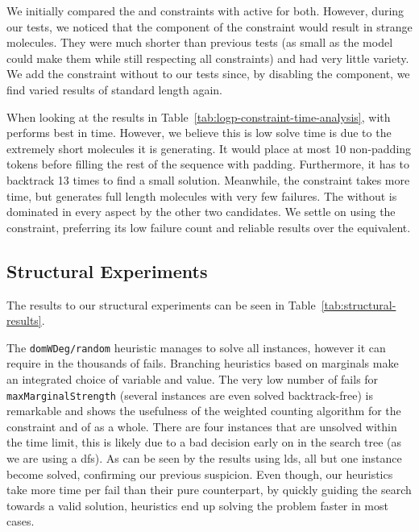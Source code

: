 \documentclass[../Document.tex]{subfiles}
\begin{document}
We initially compared the \shortTable and \regular constraints with \bp active for both. However, during our tests, we noticed that the \bp component of the \shortTable constraint would result in strange molecules. They were much shorter than previous tests (as small as the model could make them while still respecting all constraints) and had very little variety. We add the \shortTable constraint without \bp to our tests since, by disabling the \bp component, we find varied results of standard length again.

When looking at the results in Table~\ref{tab:logp-constraint-time-analysis}, \shortTable with \bp performs best in time.
However, we believe this is low solve time is due to the extremely short molecules it is generating. It would place at most 10 non-padding tokens before filling the rest of the sequence with padding.
Furthermore, it has to backtrack 13 times to find a small solution.
Meanwhile, the \regular constraint takes more time, but generates full length molecules with very few failures.
The \shortTable without \bp is dominated in every aspect by the other two candidates.
We settle on using the \regular constraint, preferring its low failure count and reliable results over the \shortTable equivalent.


\subsection{Structural Experiments}
The results to our structural experiments can be seen in Table~\ref{tab:structural-results}.

The \texttt{domWDeg/random} heuristic manages to solve all instances, however it can require in the thousands of fails.
Branching heuristics based on marginals make an integrated choice of variable and value.
The very low number of fails for \texttt{maxMarginalStrength} (several instances are even solved backtrack-free) is remarkable and shows the usefulness of the weighted counting algorithm for the \grammar constraint and of \bp as a whole.
There are four instances that are unsolved within the time limit, this is likely due to a bad decision early on in the search tree (as we are using a \gls{dfs}).
As can be seen by the results using \gls{lds}, all but one instance become solved, confirming our previous suspicion.
Even though, our \bp heuristics take more time per fail than their pure \cp counterpart, by quickly guiding the search towards a valid solution, \bp heuristics end up solving the problem faster in most cases.
\end{document}
